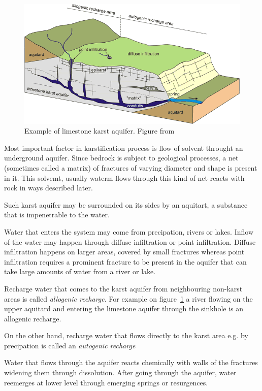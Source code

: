 \begin{figure}
  \centerline{\includegraphics[width=\textwidth]{chapters/karstification/karstification.png}}
  \caption{Example of limestone karst aquifer.
    Figure from \cite{golscheider2007methods}}
  \label{fig:karstification}
\end{figure}

Most important factor in karstification process is flow of solvent throught an
underground aquifer. Since bedrock is subject to geological processes, a
net (sometimes called a matrix) of fractures of varying diameter and shape is
present in it. This solvemt, usually waterm flows through this kind of net
reacts with rock in ways described later.

Such karst aquifer may be surrounded on its sides by an aquitart, a substance
that is impenetrable to the water.

Water that enters the system may come from precipation, rivers or lakes. Inflow
of the water may happen through diffuse infiltration or point infiltration.
Diffuse infiltration happens on larger areas, covered by small fractures whereas
point infiltration requires a prominent fracture to be present in the aquifer
that can take large amounts of water from a river or lake.

Recharge water that comes to the karst aquifer from neighbouring non-karst areas
is called \emph{allogenic recharge}. For example on figure~\ref{fig:karstification}
a river flowing on the upper aquitard and entering the limestone aquifer through
the sinkhole is an allogenic recharge.

On the other hand, recharge water that flows directly to the karst area e.g. by
precipation is called an \emph{autogenic recharge}

Water that flows through the aquifer reacts chemically with walls of the
fractures widening them through dissolution. After going through the aquifer,
water reemerges at lower level through emerging springs or resurgences.

